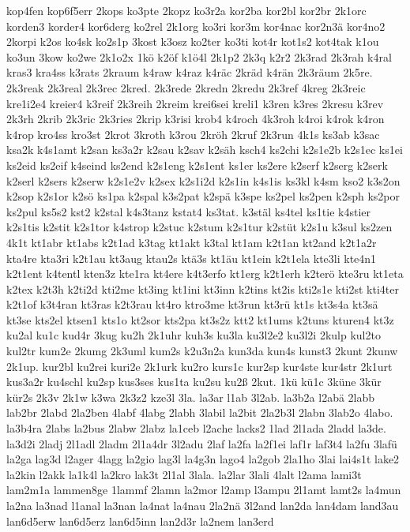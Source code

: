 {kop4fen
kop6f5err
2kops
ko3pte
2kopz
ko3r2a
kor2ba
kor2bl
kor2br
2k1orc
korden3
korder4
kor6derg
ko2rel
2k1org
ko3ri
kor3m
kor4nac
kor2n3ä
kor4no2
2korpi
k2os
ko4sk
ko2s1p
3kost
k3osz
ko2ter
ko3ti
kot4r
kot1s2
kot4tak
k1ou
ko3un
3kow
ko2we
2k1o2x
1kö
k2öf
k1ö4l
2k1p2
2k3q
k2r2
2k3rad
2k3rah
k4ral
kras3
kra4ss
k3rats
2kraum
k4raw
k4raz
k4räc
2kräd
k4rän
2k3räum
2k5re.
2k3reak
2k3real
2k3rec
2kred.
2k3rede
2kredn
2kredu
2k3ref
4kreg
2k3reic
kre1i2e4
kreier4
k3reif
2k3reih
2kreim
krei6sei
kreli1
k3ren
k3res
2kresu
k3rev
2k3rh
2krib
2k3ric
2k3ries
2krip
k3risi
krob4
k4roch
4k3roh
k4roi
k4rok
k4ron
k4rop
kro4ss
kro3st
2krot
3kroth
k3rou
2kröh
2kruf
2k3run
4k1s
ks3ab
k3sac
ksa2k
k4s1amt
k2san
ks3a2r
k2sau
k2sav
k2säh
ksch4
ks2chi
k2s1e2b
k2s1ec
ks1ei
ks2eid
ks2eif
k4seind
ks2end
k2s1eng
k2s1ent
ks1er
ks2ere
k2serf
k2serg
k2serk
k2serl
k2sers
k2serw
k2s1e2v
k2sex
k2s1i2d
k2s1in
k4s1is
ks3kl
k4sm
kso2
k3s2on
k2sop
k2s1or
k2sö
ks1pa
k2spal
k3s2pat
k2spä
k3spe
ks2pel
ks2pen
k2sph
ks2por
ks2pul
ks5s2
kst2
k2stal
k4s3tanz
kstat4
ks3tat.
k3stäl
ks4tel
ks1tie
k4stier
k2s1tis
k2stit
k2s1tor
k4strop
k2stuc
k2stum
k2s1tur
k2stüt
k2s1u
k3sul
ks2zen
4k1t
kt1abr
kt1abs
k2t1ad
k3tag
kt1akt
k3tal
kt1am
k2t1an
kt2and
k2t1a2r
kta4re
kta3ri
k2t1au
kt3aug
ktau2s
ktä3s
kt1äu
kt1ein
k2t1ela
kte3li
kte4n1
k2t1ent
k4tentl
kten3z
kte1ra
kt4ere
k4t3erfo
kt1erg
k2t1erh
k2terö
kte3ru
kt1eta
k2tex
k2t3h
k2ti2d
kti2me
kt3ing
kt1ini
kt3inn
k2tins
kt2is
kti2s1e
kti2st
kti4ter
k2t1of
k3t4ran
kt3ras
k2t3rau
kt4ro
ktro3me
kt3run
kt3rü
kt1s
kt3s4a
kt3sä
kt3se
kts2el
ktsen1
kts1o
kt2sor
kts2pa
kt3s2z
ktt2
kt1ums
k2tuns
kturen4
kt3z
ku2al
ku1c
kud4r
3kug
ku2h
2k1uhr
kuh3s
ku3la
ku3l2e2
ku3l2i
2kulp
kul2to
kul2tr
kum2e
2kumg
2k3uml
kum2s
k2u3n2a
kun3da
kun4s
kunst3
2kunt
2kunw
2k1up.
kur2bl
ku2rei
kuri2e
2k1urk
ku2ro
kurs1c
kur2sp
kur4ste
kur4str
2k1urt
kus3a2r
ku4schl
ku2sp
kus3ses
kus1ta
ku2su
ku2ß
2kut.
1kü
kü1c
3küne
3kür
kür2s
2k3v
2k1w
k3wa
2k3z2
kze3l
3la.
la3ar
l1ab
3l2ab.
la3b2a
l2abä
2labb
lab2br
2labd
2la2ben
4labf
4labg
2labh
3labil
la2bit
2la2b3l
2labn
3lab2o
4labo.
la3b4ra
2labs
la2bus
2labw
2labz
la1ceb
l2ache
lacks2
1lad
2l1ada
2ladd
la3de.
la3d2i
2ladj
2l1adl
2ladm
2l1a4dr
3l2adu
2laf
la2fa
la2f1ei
laf1r
laf3t4
la2fu
3lafü
la2ga
lag3d
l2ager
4lagg
la2gio
lag3l
la4g3n
lago4
la2gob
2la1ho
3lai
lai4s1t
lake2
la2kin
l2akk
la1k4l
la2kro
lak3t
2l1al
3lala.
la2lar
3lali
4lalt
l2ama
lami3t
lam2m1a
lammen8ge
1lammf
2lamn
la2mor
l2amp
l3ampu
2l1amt
lamt2s
la4mun
la2na
la3nad
l1anal
la3nan
la4nat
la4nau
2la2nä
3l2and
lan2da
lan4dam
land3au
lan6d5erw
lan6d5erz
lan6d5inn
lan2d3r
la2nem
lan3erd
}
